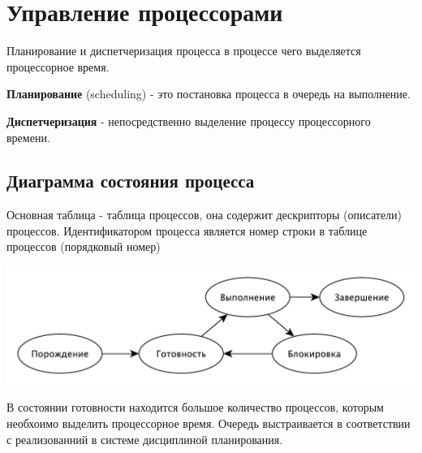 \documentclass[a4paper, 14pt]{report}
\begin{document}
\section{Управление процессорами}

Планирование и диспетчеризация процесса в процессе чего выделяется процессорное время.

\textbf{Планирование} (scheduling) - это постановка процесса в очередь на выполнение.

\textbf{Диспетчеризация} - непосредственно выделение процессу процессорного времени.

\subsection{Диаграмма состояния процесса}

Основная таблица - таблица процессов, она содержит дескрипторы (описатели)
процессов. Идентификатором процесса является номер строки в таблице процессов 
(порядковый номер)

\begin{center}
    \includegraphics[scale=0.7]{os2}
\end{center}

В состоянии готовности находится большое количество процессов, которым необхоимо выделить процессорное время. Очередь выстраивается в соответствии с реализованний в системе дисциплиной планирования.
\end{document}
